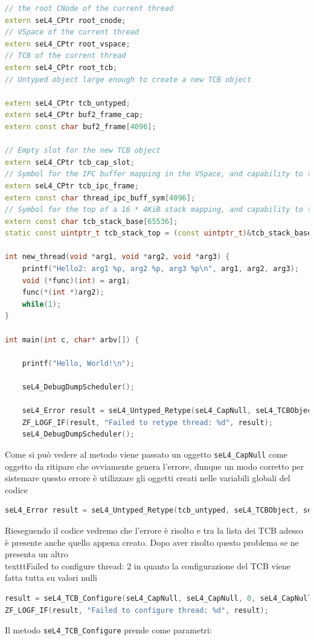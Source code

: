 \begin{lstlisting}[language=C++]
// the root CNode of the current thread
extern seL4_CPtr root_cnode;
// VSpace of the current thread
extern seL4_CPtr root_vspace;
// TCB of the current thread
extern seL4_CPtr root_tcb;
// Untyped object large enough to create a new TCB object

extern seL4_CPtr tcb_untyped;
extern seL4_CPtr buf2_frame_cap;
extern const char buf2_frame[4096];

// Empty slot for the new TCB object
extern seL4_CPtr tcb_cap_slot;
// Symbol for the IPC buffer mapping in the VSpace, and capability to the mapping
extern seL4_CPtr tcb_ipc_frame;
extern const char thread_ipc_buff_sym[4096];
// Symbol for the top of a 16 * 4KiB stack mapping, and capability to the mapping
extern const char tcb_stack_base[65536];
static const uintptr_t tcb_stack_top = (const uintptr_t)&tcb_stack_base + sizeof(tcb_stack_base);

int new_thread(void *arg1, void *arg2, void *arg3) {
    printf("Hello2: arg1 %p, arg2 %p, arg3 %p\n", arg1, arg2, arg3);
    void (*func)(int) = arg1;
    func(*(int *)arg2);
    while(1);
}

int main(int c, char* arbv[]) {

    printf("Hello, World!\n");

    seL4_DebugDumpScheduler();

    seL4_Error result = seL4_Untyped_Retype(seL4_CapNull, seL4_TCBObject, seL4_TCBBits, seL4_CapNull, 0, 0, seL4_CapNull, 1);
    ZF_LOGF_IF(result, "Failed to retype thread: %d", result);
    seL4_DebugDumpScheduler();
\end{lstlisting}
Come si può vedere al metodo viene passato un oggetto \texttt{seL4\_CapNull} come oggetto da ritipare che ovviamente genera l'errore, dunque un modo corretto per sistemare questo errore è utilizzare gli oggetti creati nelle variabili globali del codice
\begin{lstlisting}[language=C++]
seL4_Error result = seL4_Untyped_Retype(tcb_untyped, seL4_TCBObject, seL4_TCBBits, root_cnode, 0, 0, tcb_cap_slot, 1);
\end{lstlisting}
Rieseguendo il codice vedremo che l'errore è risolto e tra la lista dei TCB adesso è presente anche quello appena creato. Dopo aver risolto questo problema se ne presenta un altro \\texttt{Failed to configure thread: 2} in quanto la configurazione del TCB viene fatta tutta su valori nulli
\begin{lstlisting}[language=C++]
result = seL4_TCB_Configure(seL4_CapNull, seL4_CapNull, 0, seL4_CapNull, 0, 0, (seL4_Word) NULL, seL4_CapNull);
ZF_LOGF_IF(result, "Failed to configure thread: %d", result);
\end{lstlisting}
Il metodo \texttt{seL4\_TCB\_Configure} prende come parametri:

